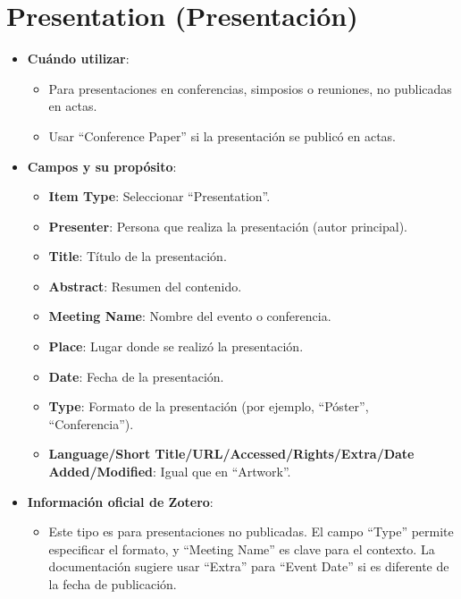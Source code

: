 \documentclass[
  jou,
  floatsintext,
  longtable,
  a4paper,
  nolmodern,
  notxfonts,
  notimes,
  12pt,
  colorlinks=true,linkcolor=blue,citecolor=blue,urlcolor=blue]{apa7}
\providecommand{\tightlist}{%
  \setlength{\itemsep}{0pt}\setlength{\parskip}{0pt}}
\begin{document}
\section{Presentation
(Presentación)}\label{presentation-presentaciuxf3n}

\begin{itemize}
\tightlist
\item
  \textbf{Cuándo utilizar}:

  \begin{itemize}
  \tightlist
  \item
    Para presentaciones en conferencias, simposios o reuniones, no
    publicadas en actas.
  \item
    Usar ``Conference Paper'' si la presentación se publicó en actas.
  \end{itemize}
\item
  \textbf{Campos y su propósito}:

  \begin{itemize}
  \tightlist
  \item
    \textbf{Item Type}: Seleccionar ``Presentation''.
  \item
    \textbf{Presenter}: Persona que realiza la presentación (autor
    principal).
  \item
    \textbf{Title}: Título de la presentación.
  \item
    \textbf{Abstract}: Resumen del contenido.
  \item
    \textbf{Meeting Name}: Nombre del evento o conferencia.
  \item
    \textbf{Place}: Lugar donde se realizó la presentación.
  \item
    \textbf{Date}: Fecha de la presentación.
  \item
    \textbf{Type}: Formato de la presentación (por ejemplo, ``Póster'',
    ``Conferencia'').
  \item
    \textbf{Language/Short Title/URL/Accessed/Rights/Extra/Date
    Added/Modified}: Igual que en ``Artwork''.
  \end{itemize}
\item
  \textbf{Información oficial de Zotero}:

  \begin{itemize}
  \tightlist
  \item
    Este tipo es para presentaciones no publicadas. El campo ``Type''
    permite especificar el formato, y ``Meeting Name'' es clave para el
    contexto. La documentación sugiere usar ``Extra'' para ``Event
    Date'' si es diferente de la fecha de publicación.
  \end{itemize}
\end{itemize}
\end{document}
